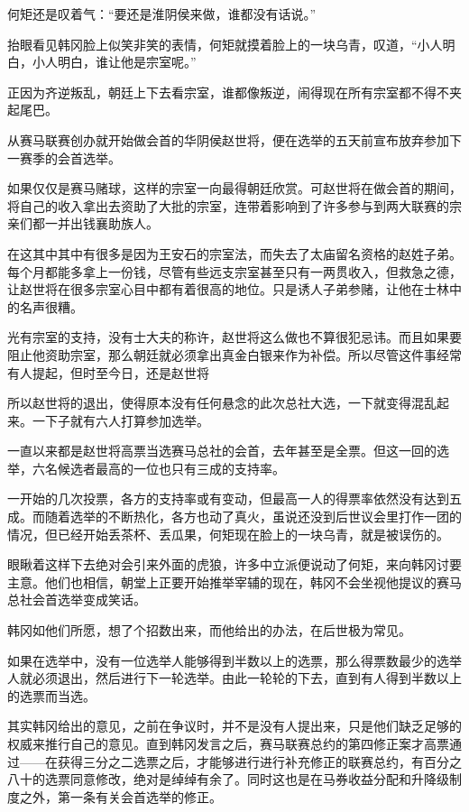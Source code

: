 何矩还是叹着气：“要还是淮阴侯来做，谁都没有话说。”

抬眼看见韩冈脸上似笑非笑的表情，何矩就摸着脸上的一块乌青，叹道，“小人明白，小人明白，谁让他是宗室呢。”

正因为齐逆叛乱，朝廷上下去看宗室，谁都像叛逆，闹得现在所有宗室都不得不夹起尾巴。

从赛马联赛创办就开始做会首的华阴侯赵世将，便在选举的五天前宣布放弃参加下一赛季的会首选举。

如果仅仅是赛马赌球，这样的宗室一向最得朝廷欣赏。可赵世将在做会首的期间，将自己的收入拿出去资助了大批的宗室，连带着影响到了许多参与到两大联赛的宗亲们都一并出钱襄助族人。

在这其中其中有很多是因为王安石的宗室法，而失去了太庙留名资格的赵姓子弟。每个月都能多拿上一份钱，尽管有些远支宗室甚至只有一两贯收入，但救急之德，让赵世将在很多宗室心目中都有着很高的地位。只是诱人子弟参赌，让他在士林中的名声很糟。

光有宗室的支持，没有士大夫的称许，赵世将这么做也不算很犯忌讳。而且如果要阻止他资助宗室，那么朝廷就必须拿出真金白银来作为补偿。所以尽管这件事经常有人提起，但时至今日，还是赵世将

所以赵世将的退出，使得原本没有任何悬念的此次总社大选，一下就变得混乱起来。一下子就有六人打算参加选举。

一直以来都是赵世将高票当选赛马总社的会首，去年甚至是全票。但这一回的选举，六名候选者最高的一位也只有三成的支持率。

一开始的几次投票，各方的支持率或有变动，但最高一人的得票率依然没有达到五成。而随着选举的不断热化，各方也动了真火，虽说还没到后世议会里打作一团的情况，但已经开始丢茶杯、丢瓜果，何矩现在脸上的一块乌青，就是被误伤的。

眼瞅着这样下去绝对会引来外面的虎狼，许多中立派便说动了何矩，来向韩冈讨要主意。他们也相信，朝堂上正要开始推举宰辅的现在，韩冈不会坐视他提议的赛马总社会首选举变成笑话。

韩冈如他们所愿，想了个招数出来，而他给出的办法，在后世极为常见。

如果在选举中，没有一位选举人能够得到半数以上的选票，那么得票数最少的选举人就必须退出，然后进行下一轮选举。由此一轮轮的下去，直到有人得到半数以上的选票而当选。

其实韩冈给出的意见，之前在争议时，并不是没有人提出来，只是他们缺乏足够的权威来推行自己的意见。直到韩冈发言之后，赛马联赛总约的第四修正案才高票通过——在获得三分之二选票之后，才能够进行进行补充修正的联赛总约，有百分之八十的选票同意修改，绝对是绰绰有余了。同时这也是在马券收益分配和升降级制度之外，第一条有关会首选举的修正。


